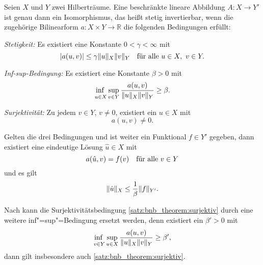 \documentclass[../main.tex]{subfiles}
\begin{document}
\begin{Satz}
\label{satz:bnb_theorem}
    Seien $X$ und $Y$ zwei Hilberträume.
    Eine beschränkte lineare Abbildung $A \colon X \to Y'$ ist genau dann ein Isomorphismus, das heißt stetig invertierbar, wenn die zugehörige Bilinearform $a \colon X \times Y \to \mathbb{R}$ die folgenden Bedingungen erfüllt:
    \begin{thmenumerate}
        \item \label{satz:bnb_theorem:stetig}
        \emph{Stetigkeit:}
        Es existiert eine Konstante $0 < \gamma < \infty$ mit
        \begin{equation}
            \abs{a(u, v)} \leq \gamma \norm{u}_{X} \norm{v}_{Y} \quad \fa u \in X,~v\in Y.
        \end{equation}
        \item \label{satz:bnb_theorem:inf_sup_bedingung}
        \emph{Inf-sup-Bedingung:}
        Es existiert eine Konstante $\beta > 0$ mit
        \begin{equation}
            \infsup{u \in X}{v \in Y} \frac{a(u, v)}{\norm{u}_{X} \norm{v}_{Y}} \geq \beta.
        \end{equation}
        \item \label{satz:bnb_theorem:surjektiv}
        \emph{Surjektivität:}
        Zu jedem $v \in Y$, $v \neq 0$, existiert ein $u \in X$ mit
        \begin{equation}
            a(u, v) \neq 0.
        \end{equation}
    \end{thmenumerate}
    Gelten die drei Bedingungen und ist weiter ein Funktional $f \in Y'$ gegeben, dann existiert eine eindeutige Lösung $\hat u \in X$ mit
    \begin{equation}
        a(\hat u, v) = f(v) \quad \fa v \in Y
    \end{equation}
    und es gilt
    \begin{equation}
        \norm{\hat u}_{X} \leq \frac{1}{\beta} \norm{f}_{Y'}.
    \end{equation}
\end{Satz}

\begin{Bemerkung}
\label{bemerkung:bnb_theorem_inf_sup_statt_surjektiv}
    Nach \cite[Remarks, S. 117]{Aziz:1972wf} kann die Surjektivitätsbedingung \cref{satz:bnb_theorem:surjektiv} durch eine weitere inf"=sup"=Bedingung ersetzt werden, denn existiert ein $\beta' > 0$ mit
    \begin{equation}
        \infsup{v \in Y}{u \in X} \frac{a(u, v)}{\norm{u}_{X} \norm{v}_{Y}} \geq \beta',
    \end{equation}
    dann gilt insbesondere auch \cref{satz:bnb_theorem:surjektiv}.
\end{Bemerkung}
\end{document}
